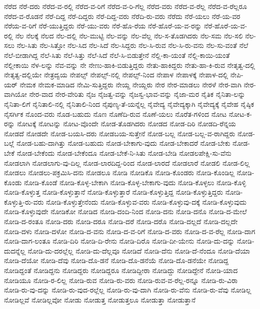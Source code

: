 {ನೆರೆದ
ನೆರೆ-ದರು
ನೆರೆದ-ವ-ರಲ್ಲಿ
ನೆರೆದ-ವ-ರಿಗೆ
ನೆರೆದ-ವ-ರಿ-ಗೆಲ್ಲ
ನೆರೆದ-ವರು
ನೆರೆದ-ವ-ರೆಲ್ಲ
ನೆರೆದ-ವ-ರೆಲ್ಲರೂ
ನೆರೆದ-ವ-ರೊಡನೆ
ನೆರೆ-ದಿದ್ದ
ನೆರೆ-ದಿದ್ದರು
ನೆರೆ-ದಿದ್ದ-ವರು
ನೆರೆದಿ-ರು-ವರು
ನೆರೆದು
ನೆರೆ-ಯಲು
ನೆರೆ-ಯ-ವರ
ನೆರೆಯ-ವ-ರಿಗೆ
ನೆರೆ-ಯುತ್ತಿದ್ದರು
ನೆರೆ-ಯು-ವರು
ನೆರೆ-ಹೊ-ರೆಯ
ನೆರೆ-ಹೊರೆ-ಯ-ವ-ರನ್ನು
ನೆರೆ-ಹೊರೆ-ಯ-ವ-ರಲ್ಲಿ
ನೆಲ
ನೆಲಕ್ಕೆ
ನೆಲದ
ನೆಲ-ದಲ್ಲಿ
ನೆಲ-ಮುಟ್ಟಿ
ನೆಲ-ವನ್ನು
ನೆಲ-ವೆಲ್ಲ
ನೆಲ-ಸ-ತೊಡಗಿದರು
ನೆಲ-ಸಮ
ನೆಲ-ಸಲಿ
ನೆಲ-ಸಲು
ನೆಲ-ಸಿತು
ನೆಲ-ಸಿತ್ತೋ
ನೆಲ-ಸಿದ
ನೆಲ-ಸಿದೆ
ನೆಲ-ಸಿದ್ದರು
ನೆಲ-ಸಿ-ರುವ
ನೆಲ-ಸಿ-ರು-ವನು
ನೆಲ-ಸು-ವಂತೆ
ನೆಲೆ
ನೆಲೆ-ಬೀಡಾಗಿದ್ದ
ನೆಲೆ-ಸಿತು
ನೆಲೆ-ಸಿತ್ತು
ನೆಲೆ-ಸಿದೆ
ನೆಲೆ-ಸಿ-ಬಿಡುತ್ತೇನೆ
ನೆಲ್ಲಿ-ಕಾ-ಯಂತೆ
ನೆಲ್ಲಿ-ಕಾಯಿ-ಯಂತೆ
ನೆಲ್ಲೀಕಾಯಿ
ನೆಳ-ಲನ್ನು
ನೆವ-ವನ್ನು
ನೇ
ನೇಣು-ಹಾಕಿ-ಬಿಡುತ್ತಿದ್ದರು
ನೇತು-ಹಾಕಿದ್ದರು
ನೇತು-ಹಾ-ಕಿ-ರುವ
ನೇತೃತ್ವ-ದಲ್ಲಿ
ನೇತೃತ್ವ-ದಲ್ಲಿಯೇ
ನೇತ್ರದ್ವಯ
ನೇಪಲ್ಸ್
ನೇಪಲ್ಸ್-ನಲ್ಲಿ
ನೇಪಲ್ಸ್-ನಿಂದ
ನೇಪಾಳ
ನೇಪಾಳಕ್ಕೆ
ನೇಪಾಳ-ದಲ್ಲಿ
ನೇಪಿ-ಯರ್
ನೇಮಕ
ನೇಮಕ-ಮಾಡಿದ
ನೇಮಿ-ಸುತ್ತಿದ್ದರು
ನೇಯ್ದ
ನೇಯ್ದರು
ನೇರ
ನೇರ-ಮಾಡಲು
ನೇರಳೆ
ನೇರ-ವಾಗಿ
ನೇರ-ವಾಗಿಯೋ
ನೇರ-ವಾದ
ನೇರ-ವೇರಿತು
ನೈಜ
ನೈಜತ್ವ-ವನ್ನು
ನೈಜಸ್ವ-ಭಾವ-ವನ್ನು
ನೈಜಾ-ಮರ
ನೈತಿಕ
ನೈನಿತಾ-ಲನ್ನು
ನೈನಿತಾ-ಲಿಗೆ
ನೈನಿತಾಲಿ-ನಲ್ಲಿ
ನೈನಿತಾಲಿ-ನಿಂದ
ನೈಪುಣ್ಯ-ತೆ-ಯನ್ನೆಲ್ಲ
ನೈವೇದ್ಯ
ನೈವೇದ್ಯಕ್ಕಾಗಿ
ನೈವೇದ್ಯಕ್ಕೆ
ನೈವೇಹ
ನೈಷ್ಠಿಕ
ನೈಸರ್ಗಿಕ
ನೊಂದ-ವರು
ನೊಡ-ಬಹುದು
ನೊಣ
ನೊಣೆದಿ-ರುವ
ನೊಣೆ-ಯಲು
ನೊರೆತ-ಗಳಿಂದ
ನೋಟ
ನೋಟ-ಕ-ರನ್ನು
ನೋಟಕ್ಕೆ
ನೋಟನ್ನು
ನೋಟ-ವೊಂದೇ
ನೋಡ-ತೊಡಗಿದರು
ನೋಡದ
ನೋಡ-ದಿರಿ
ನೋಡದಿ-ರೆನ್ನಯ
ನೋಡದೆ
ನೋಡದೇ
ನೋಡ-ಬಯಸಿ-ದರು
ನೋಡಬಯ-ಸುತ್ತೇನೆ
ನೋಡ-ಬಲ್ಲ
ನೋಡ-ಬಲ್ಲ-ವ-ರಾಗಿದ್ದರು
ನೋಡ-ಬಲ್ಲೆ
ನೋಡ-ಬಹು-ದಾಗಿತ್ತು
ನೋಡ-ಬಹುದು
ನೋಡ-ಬೇಕಾಗು-ವುದು
ನೋಡ-ಬೇಕಾದರೆ
ನೋಡ-ಬೇಕು
ನೋಡ-ಬೇಕೆ
ನೋಡ-ಬೇಕೆಂದು
ನೋಡ-ಬೇಕೆಂದೂ
ನೋಡ-ಬೇಕೆ-ನಿ-ಸಿತು
ನೋಡ-ಬೇಡಿ
ನೋಡಲಪೇಕ್ಷಿ-ಸು-ವೆನು
ನೋಡಲಾಗಿ
ನೋಡಲಾಗು-ವು-ದಿಲ್ಲ
ನೋಡ-ಲಾರದಿದ್ದ-ರಿಂದ
ನೋಡ-ಲಾರದೆ
ನೋಡಲಾರೆ
ನೋಡಲಿ
ನೋಡ-ಲಿಲ್ಲ
ನೋಡಲು
ನೋಡಲು-ಪಕ್ರಮಿಸಿ-ದನು
ನೋಡಲೂ
ನೋಡಿ
ನೋಡಿಕೊ
ನೋಡಿ-ಕೊಂಡರು
ನೋಡಿ-ಕೊಂಡಿಲ್ಲ
ನೋಡಿ-ಕೊಂಡು
ನೋಡಿ-ಕೊಂಡೆ
ನೋಡಿ-ಕೊಳ್ಳ-ಬೇಕಾಗಿ
ನೋಡಿ-ಕೊಳ್ಳ-ಬೇಕಾಗು-ವುದು
ನೋಡಿ-ಕೊಳ್ಳಲು
ನೋಡಿ-ಕೊಳ್ಳಿ
ನೋಡಿ-ಕೊಳ್ಳುತ್ತ
ನೋಡಿ-ಕೊಳ್ಳುತ್ತಾನೆ
ನೋಡಿ-ಕೊಳ್ಳುತ್ತಾರೆ
ನೋಡಿ-ಕೊಳ್ಳುತ್ತಿದ್ದ
ನೋಡಿ-ಕೊಳ್ಳುತ್ತಿದ್ದರು
ನೋಡಿ-ಕೊಳ್ಳುತ್ತಿ-ರು-ವರು
ನೋಡಿ-ಕೊಳ್ಳುತ್ತೇನೆಂದು
ನೋಡಿ-ಕೊಳ್ಳುವ-ವರು
ನೋಡಿ-ಕೊಳ್ಳುವು-ದಕ್ಕೆ
ನೋಡಿ-ಕೊಳ್ಳುವುದು
ನೋಡಿ-ಕೊಳ್ಳುವುದೇ
ನೋಡಿಕೋ
ನೋಡಿದ
ನೋಡಿ-ದಂದಿ-ನಿಂದ
ನೋಡಿ-ದನು
ನೋಡಿ-ದನೊ
ನೋಡಿ-ದ-ಮೇಲೆ
ನೋಡಿ-ದ-ರಂತೂ
ನೋಡಿ-ದರು
ನೋಡಿ-ದರೂ
ನೋಡಿ-ದರೆ
ನೋಡಿ-ದರೊ
ನೋಡಿ-ದಲ್ಲದೆ
ನೋಡಿ-ದಲ್ಲದೇ
ನೋಡಿ-ದಳು
ನೋಡಿ-ದಳೋ
ನೋಡಿ-ದ-ವನು
ನೋಡಿ-ದ-ವ-ರಿಗೆ
ನೋಡಿ-ದ-ವರು
ನೋಡಿ-ದ-ವ-ರೆಲ್ಲ
ನೋಡಿ-ದಾಗ
ನೋಡಿ-ದಾಗ-ಲಂತೂ
ನೋಡಿ-ದಿರಿ
ನೋಡಿ-ದಿ-ರೇನು
ನೋಡಿ-ದಿರೊ
ನೋಡಿ-ದೀ-ಯೇನು
ನೋಡಿ-ದು-ದನ್ನು
ನೋಡಿ-ದುದನ್ನೆಲ್ಲ
ನೋಡಿ-ದು-ದರಲ್ಲೆಲ್ಲ
ನೋಡಿ-ದು-ದೆಲ್ಲವೂ
ನೋಡಿದೆ
ನೋಡಿ-ದೆನು
ನೋಡಿ-ದೆ-ನೆಂದೂ
ನೋಡಿ-ದೆಯಾ
ನೋಡಿ-ದೆಯೋ
ನೋಡಿ-ದೆವು
ನೋಡಿ-ದೊ-ಡನೆ
ನೋಡಿ-ದೊ-ಡನೆಯೆ
ನೋಡಿ-ದೊ-ಡನೆಯೇ
ನೋಡಿದ್ದ
ನೋಡಿದ್ದಂತೆ
ನೋಡಿದ್ದನು
ನೋಡಿದ್ದರು
ನೋಡಿದ್ದರೂ
ನೋಡಿದ್ದೀರಾ
ನೋಡಿದ್ದು
ನೋಡಿದ್ದೇನೆ
ನೋಡಿ-ಯಾದ
ನೋಡಿಯೂ
ನೋಡಿ-ರ-ಲಿಲ್ಲ
ನೋಡಿ-ರುವ
ನೋಡಿ-ರು-ವರು
ನೋಡಿ-ರುವ-ವ-ರೆಲ್ಲ-ರನ್ನೂ
ನೋಡಿ-ರು-ವಿರಾ
ನೋಡಿ-ರು-ವು-ದನ್ನು
ನೋಡಿ-ರು-ವುದ-ರಲ್ಲೆಲ್ಲ
ನೋಡಿ-ರು-ವು-ದಾಗಿ
ನೋಡಿ-ರು-ವೆನು
ನೋಡಿ-ರು-ವೆವು
ನೋಡಿಲ್ಲ
ನೋಡಿಲ್ಲವೆ
ನೋಡಿಲ್ಲವೋ
ನೋಡು
ನೋಡುತ್ತ
ನೋಡುತ್ತಲೂ
ನೋಡುತ್ತಾ
ನೋಡುತ್ತಾನೆ
}
